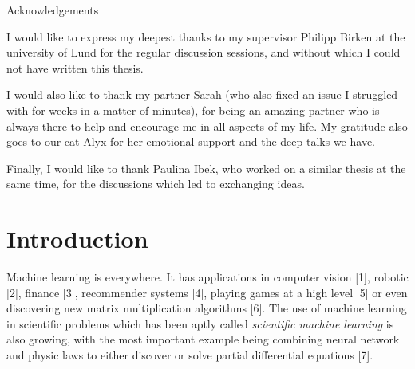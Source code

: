\documentclass[
  letterpaper,
]{report}
\renewcommand*\contentsname{Table of contents}
\newcommand\contentsname{Table of contents}
\theoremstyle{plain}
\theoremstyle{definition}
\theoremstyle{definition}
\theoremstyle{remark}
\begin{document}
\newpage



\begin{center}
\huge{Acknowledgements}
\end{center}

\vspace*{\baselineskip}

I would like to express my deepest thanks to my supervisor Philipp Birken at the university of Lund for the regular discussion sessions, and without which I could not have written this thesis.

I would also like to thank my partner Sarah (who also fixed an issue I struggled with for weeks in a matter of minutes), for being an amazing partner who is always there to help and encourage me in all aspects of my life. My gratitude also goes to our cat Alyx for her emotional support and the deep talks we have. 

Finally, I would like to thank Paulina Ibek, who worked on a similar thesis at the same time, for the discussions which led to exchanging ideas.

\newpage
\ifdefined\Shaded\renewenvironment{Shaded}{\begin{tcolorbox}[borderline west={3pt}{0pt}{shadecolor}, sharp corners, frame hidden, interior hidden, breakable, enhanced, boxrule=0pt]}{\end{tcolorbox}}\fi

\renewcommand*\contentsname{Table of contents}
{
\hypersetup{linkcolor=}
\setcounter{tocdepth}{2}
\tableofcontents
}

\hypertarget{introduction}{%
\chapter*{Introduction}\label{introduction}}


Machine learning is everywhere. It has applications in computer vision
{[}1{]}, robotic {[}2{]}, finance {[}3{]}, recommender systems {[}4{]},
playing games at a high level {[}5{]} or even discovering new matrix
multiplication algorithms {[}6{]}. The use of machine learning in
scientific problems which has been aptly called \emph{scientific machine
learning} is also growing, with the most important example being
combining neural network and physic laws to either discover or solve
partial differential equations {[}7{]}.
\end{document}
